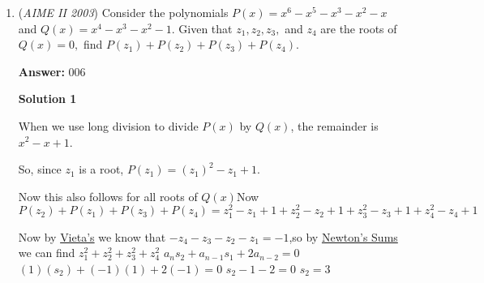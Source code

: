 \begin{enumerate}
Start by labeling the two sequences:

 Sequence 1:$a,a+d_1,a+2d_1,\dots a+(n-1)d_1$,

 Sequence 2:$b,b+d_2,b+2d_2,\dots b+(n-1)d_2$.

 Additionally, label the sequence given in the problem the function $f$, such that 

 $f(1)=1440,f(2)=1716,f(3)=1848$.

 Then, 

 $f(1)=ab,$
$f(2)=(a+d_1)(b+d_2)=a+ad_2+d_1b+d_1d_2,$
$f(3)=(a+2d_1)(b+2d_2)=ab+2ad_2+2bd_1+4d_1d_2,$

 and $f(8)=(a+7d_1)(b+7d_2)=ab+7ad_2+7bd_1+49d_1d_2$.

 In order to find $f(8)$ add $f(3)$ enough times to get the difference between the $d_1d_2$ and $ad_2+bd_1$ terms, then add $f(2)$ and $f(1)$ to get the other terms:

 $21f(3)=21ab+42ad_2+42bd_1+84d_1d_2$
$21f(3)-35f(2)=21ab+42ad_2+42bd_1+84d_1d_2-35a-35ad_2-35d_1b-35d_1d_2=-14ab+7ad_2+7bd_1+49d_1d_2$
$21f(3)-35f(2)+15f(1)=-14ab+7ad_2+7bd_1+49d_1d_2+15ab=ab+7ad_2+7bd_1+49d_1d_2$

 Now that the expression is in terms of the given values, insert values and solve:

 $21*1848-35*1716+15*1440=1848+20*132+(20*1716-35*1716+15*1716)+15*(-276)$
$=1848+5*132+15(132-276)$
$=1848+660+15(-144)$
$=348$



	\item (\textit{AIME II 2003}) Consider the polynomials $P(x) = x^{6} - x^{5} - x^{3} - x^{2} - x$ and $Q(x) = x^{4} - x^{3} - x^{2} - 1.$ Given that $z_{1},z_{2},z_{3},$ and $z_{4}$ are the roots of $Q(x) = 0,$ find $P(z_{1}) + P(z_{2}) + P(z_{3}) + P(z_{4}).$

 \textbf{Answer: }006



\textbf{Solution 1}

When we use long division to divide $P(x)$ by $Q(x)$, the remainder is $x^2-x+1$.

 So, since $z_1$ is a root, $P(z_1)=(z_1)^2-z_1+1$.

 Now this also follows for all roots of $Q(x)$Now 
 \[P(z_2)+P(z_1)+P(z_3)+P(z_4)=z_1^2-z_1+1+z_2^2-z_2+1+z_3^2-z_3+1+z_4^2-z_4+1\]

 Now by \href{https://artofproblemsolving.com/wiki/index.php?title=Vieta\%27s\_formulas}{Vieta's} we know that $-z_4-z_3-z_2-z_1=-1$,so by \href{https://artofproblemsolving.com/wiki/index.php?title=Newton\%27s\_Sums}{Newton's Sums} we can find $z_1^2+z_2^2+z_3^2+z_4^2$
$a_ns_2+a_{n-1}s_1+2a_{n-2}=0$
$(1)(s_2)+(-1)(1)+2(-1)=0$
$s_2-1-2=0$
$s_2=3$


\end{enumerate}

